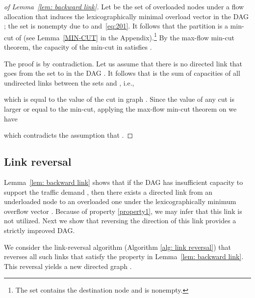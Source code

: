 \documentclass{sig-alternate-2013}
\begin{document}
\begin{proof}[of Lemma~\ref{lem: backward link}]
Let  be the set of overloaded nodes  under a flow allocation that induces the lexicographically minimal overload vector  in the DAG ; the set  is nonempty due to  and~\eqref{eq:201}. It follows that the partition  is a min-cut of  (see Lemma~\ref{MIN-CUT} in the Appendix).\footnote{The set  contains the destination node  and is nonempty.} By the max-flow min-cut theorem, the capacity of the min-cut  in  satisfies .

The proof is by contradiction. Let us assume that there is no directed link that goes from the set  to  in the DAG . It follows that  is the sum of capacities of all undirected links between the sets  and , i.e., 

which is equal to the value of the cut  in graph .
Since the value of any cut is larger or equal to the min-cut, applying the max-flow min-cut theorem on  we have

which contradicts the assumption that .
\end{proof}


\subsection{Link reversal}

Lemma~\ref{lem: backward link} shows that if the DAG  has insufficient capacity to support the traffic demand , then there exists a directed link from an underloaded node  to an overloaded one  under the lexicographically minimum overflow vector . 
Because of property \eqref{property1}, we may infer that this link is not utilized. Next we show that reversing the direction of this link provides a strictly improved DAG.

We consider the link-reversal algorithm (Algorithm \ref{alg: link reversal}) that reverses all such links that satisfy the property in Lemma~\ref{lem: backward link}. This reversal yields a new directed graph .
\begin{algorithm}[h!] 
\caption{Link-Reversal Algorithm}
\label{alg: link reversal}
\begin{algorithmic}[1]
	\ForAll {}
		\If{} 
			\State 
		\Else
			\State 
		\EndIf
	\EndFor
\end{algorithmic}
\end{algorithm}
\end{document}
